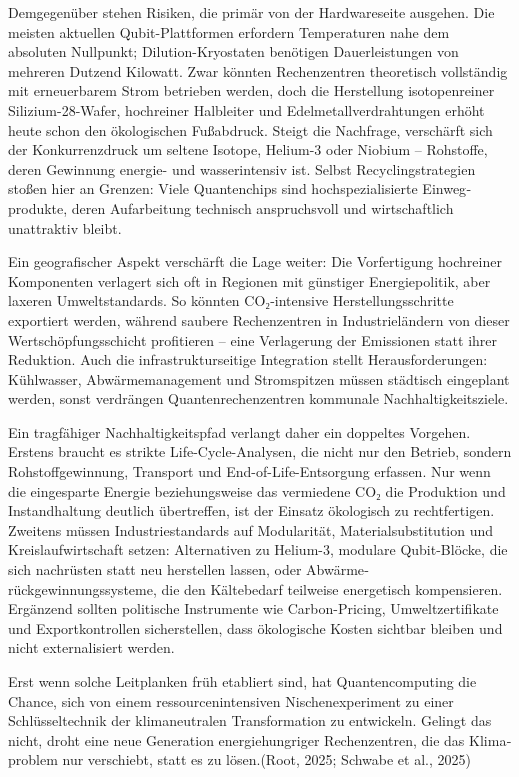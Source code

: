 Demgegenüber stehen Risiken, die primär von der Hardware­seite ausgehen. Die meisten aktuellen Qubit-Plattformen erfordern Tempera­turen nahe dem absoluten Nullpunkt; Dilution-Kryostaten benötigen Dauerleistungen von mehreren Dutzend Kilowatt. Zwar könnten Rechen­zentren theoretisch vollständig mit erneuerbarem Strom betrieben werden, doch die Herstellung isotopen­reiner Silizium-28-Wafer, hochreiner Halbleiter und Edelmetall­verdrahtungen erhöht heute schon den ökologischen Fußabdruck. Steigt die Nachfrage, verschärft sich der Konkurrenz­druck um seltene Isotope, Helium-3 oder Niobium – Rohstoffe, deren Gewinnung energie- und wasser­intensiv ist. Selbst Recycling­strategien stoßen hier an Grenzen: Viele Quanten­chips sind hochspezialisierte Einweg­produkte, deren Aufarbeitung technisch anspruchsvoll und wirtschaftlich unattraktiv bleibt.

Ein geografischer Aspekt verschärft die Lage weiter: Die Vorfertigung hochreiner Komponenten verlagert sich oft in Regionen mit günstiger Energie­politik, aber laxeren Umwelt­standards. So könnten CO₂-intensive Herstellungsschritte exportiert werden, während saubere Rechenzentren in Industrieländern von dieser Wertschöpfungsschicht profitieren – eine Verlagerung der Emissionen statt ihrer Reduktion. Auch die infrastruktur­seitige Integration stellt Herausforderungen: Kühlwasser, Abwärme­management und Stromspitzen müssen städtisch eingeplant werden, sonst verdrängen Quanten­rechen­zentren kommunale Nachhaltigkeits­ziele.

Ein tragfähiger Nachhaltigkeits­pfad verlangt daher ein doppeltes Vorgehen. Erstens braucht es strikte Life-Cycle-Analysen, die nicht nur den Betrieb, sondern Rohstoff­gewinnung, Transport und End-of-Life-Entsorgung erfassen. Nur wenn die eingesparte Energie beziehungsweise das vermiedene CO₂ die Produktion und Instand­haltung deutlich übertreffen, ist der Einsatz ökologisch zu rechtfertigen. Zweitens müssen Industrie­standards auf Modularität, Material­substitution und Kreislauf­wirtschaft setzen: Alternativen zu Helium-3, modulare Qubit-Blöcke, die sich nachrüsten statt neu herstellen lassen, oder Abwärme­rückgewinnungssysteme, die den Kältebedarf teilweise energetisch kompensieren. Ergänzend sollten politische Instrumente wie Carbon-Pricing, Umwelt­zertifikate und Export­kontrollen sicherstellen, dass ökologische Kosten sichtbar bleiben und nicht externalisiert werden.

Erst wenn solche Leitplanken früh etabliert sind, hat Quantencomputing die Chance, sich von einem ressourcen­intensiven Nischen­experiment zu einer Schlüssel­technik der klimaneutralen Transformation zu entwickeln. Gelingt das nicht, droht eine neue Generation energiehungriger Rechen­zentren, die das Klima­problem nur verschiebt, statt es zu lösen.(Root, 2025; Schwabe et al., 2025)


